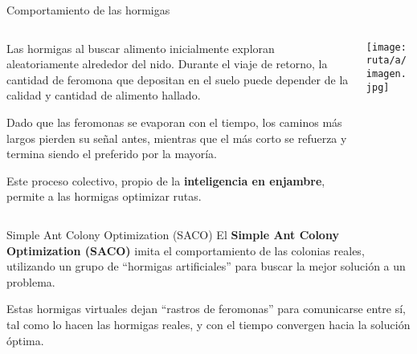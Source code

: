 \documentclass{beamer}
\begin{document}
\begin{frame}{Comportamiento de las hormigas}
\begin{columns}
    \begin{column}{0.65\textwidth}
        \justifying
        Las hormigas al buscar alimento inicialmente exploran aleatoriamente alrededor del nido. 
        Durante el viaje de retorno, la cantidad de feromona que depositan en el suelo puede depender de la calidad y cantidad de alimento hallado.
        
        \medskip
        Dado que las feromonas se evaporan con el tiempo, los caminos más largos pierden su señal antes, mientras que el más corto se refuerza y termina siendo el preferido por la mayoría.
        
        \medskip
        Este proceso colectivo, propio de la \textbf{inteligencia en enjambre}, permite a las hormigas optimizar rutas.
    \end{column}

    \begin{column}{0.35\textwidth}
        \centering
        \texttt{[image: ruta/a/imagen.jpg]} %
    \end{column}
\end{columns}
\end{frame}


\begin{frame}{Simple Ant Colony Optimization (SACO)}
\justifying
El \textbf{Simple Ant Colony Optimization (SACO)} imita el comportamiento de las colonias reales, utilizando un grupo de ``hormigas artificiales'' para buscar la mejor solución a un problema. 

\medskip
Estas hormigas virtuales dejan ``rastros de feromonas'' para comunicarse entre sí, tal como lo hacen las hormigas reales, y con el tiempo convergen hacia la solución óptima.
\end{frame}
\end{document}
